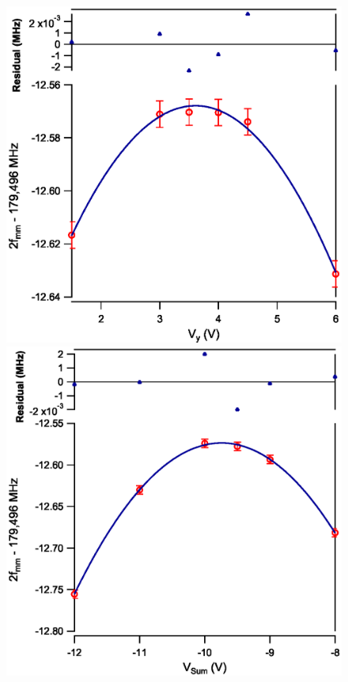 \documentclass[landscape]{sciposter}
\begin{document}
\begin{multicols}{4}
\begin{figure}
\begin{center}
\includegraphics[scale = 0.8]{Vy.eps}
\includegraphics[scale = 0.8]{sumV.eps}
\end{center}
\end{figure}


\end{multicols}
\end{document}

